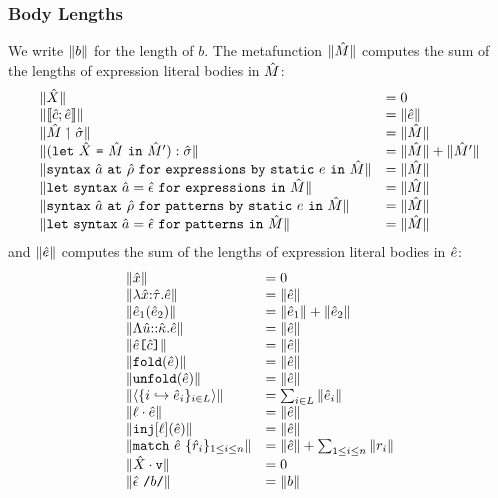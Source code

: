 \subsubsection{Body Lengths}
We write $\sizeof{b}$ for the length of $b$. 
The metafunction $\sizeof{\uM}$ computes the sum of the lengths of expression literal bodies in $\uM$:
\[
\begin{array}{ll}
\sizeof{\uX} & = 0\\
\sizeof{\struct{\uc}{\ue}} & = \sizeof{\ue}\\
\sizeof{\seal{\uM}{\usigma}} & = \sizeof{\uM}\\
\sizeof{\mlet{\uX}{\uM}{\uM'}{\usigma}} & = \sizeof{\uM} + \sizeof{\uM'}\\
\sizeof{\defpetsm{\tsmv}{\urho}{e}{\uM}} & = \sizeof{\uM}\\
\sizeof{\uletpetsm{\tsmv}{\uepsilon}{\uM}} & = \sizeof{\uM}\\
\sizeof{\defpptsm{\tsmv}{\urho}{e}{\uM}} & = \sizeof{\uM}\\
\sizeof{\uletpptsm{\tsmv}{\uepsilon}{\uM}} & = \sizeof{\uM}
\end{array}
\]
and $\sizeof{\ue}$ computes the sum of the lengths of expression literal bodies in $\ue$:
\[
\begin{array}{ll}
\sizeof{\ux} & = 0\\
\sizeof{\lam{\ux}{\utau}{\ue}} &= \sizeof{\ue}\\
\sizeof{\ap{\ue_1}{\ue_2}} & = \sizeof{\ue_1} + \sizeof{\ue_2}\\
\sizeof{\clam{\uu}{\ukappa}{\ue}} & = \sizeof{\ue}\\
\sizeof{\cAp{\ue}{\uc}} & = \sizeof{\ue}\\
\sizeof{\fold{\ue}} & = \sizeof{\ue}\\
\sizeof{\unfold{\ue}} & = \sizeof{\ue}\\
\sizeof{\tpl{\mapschema{\ue}{i}{\labelset}}} & = \sum_{i \in \labelset} \sizeof{\ue_i}\\
\sizeof{\prj{\ell}{\ue}} & = \sizeof{\ue}\\
\sizeof{\inj{\ell}{\ue}} & = \sizeof{\ue}\\
\sizeof{\matchwith{\ue}{\seqschemaX{\urv}}} & = \sizeof{\ue} + \sum_{1 \leq i \leq n} \sizeof{r_i}\\
\sizeof{\mval{\uX}} & = 0\\
\sizeof{\utsmap{\uepsilon}{b}} & = \sizeof{b}
\end{array}
\]
